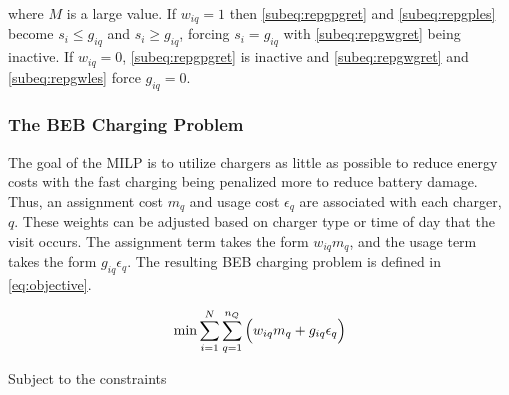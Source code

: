 \documentclass[ee,msthesis]{usuthesis}
\begin{document}
\noindent
where \(M\) is a large value. If \(w_{iq} = 1\) then \autoref{subeq:repgpgret} and \autoref{subeq:repgples} become \(s_i \leq
g_{iq}\) and \(s_i \geq g_{iq}\), forcing \(s_i = g_{iq}\) with \autoref{subeq:repgwgret} being inactive. If \(w_{iq} = 0\),
\autoref{subeq:repgpgret} is inactive and \autoref{subeq:repgwgret} and \autoref{subeq:repgwles} force \(g_{iq} = 0\).

\subsubsection{The BEB Charging Problem}
\label{sec:BEB_MILP}
The goal of the MILP is to utilize chargers as little as possible to reduce energy costs with the fast charging being
penalized more to reduce battery damage. Thus, an assignment cost \(m_q\) and usage cost \(\epsilon_q\) are associated with each
charger, \(q\). These weights can be adjusted based on charger type or time of day that the visit occurs. The assignment
term takes the form \(w_{iq}m_q\), and the usage term takes the form \(g_{iq} \epsilon_q\). The resulting BEB charging problem is
defined in \autoref{eq:objective}.

\begin{equation}
\label{eq:objective}
	\min \sum_{i=1}^N \sum_{q=1}^{n_Q} \Big( w_{iq} m_q + g_{iq} \epsilon_q \Big) \\
\end{equation}

Subject to the constraints
\end{document}
